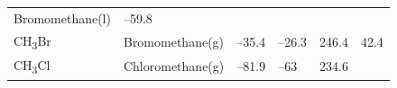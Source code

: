 \documentclass[
  9pt,
]{extbook}
\theoremstyle{definition}
\theoremstyle{definition}
\theoremstyle{definition}
\theoremstyle{remark}
\begin{document}
\begin{longtable}[]{@{}llllll@{}}
\begin{minipage}[t]{0.17\columnwidth}
Bromomethane(l)\strut
\end{minipage} & \begin{minipage}[t]{0.15\columnwidth}\raggedright
--59.8\strut
\end{minipage} & \begin{minipage}[t]{0.15\columnwidth}\raggedright
\strut
\end{minipage} & \begin{minipage}[t]{0.14\columnwidth}\raggedright
\strut
\end{minipage} & \begin{minipage}[t]{0.14\columnwidth}\raggedright
\strut
\end{minipage}\tabularnewline
\begin{minipage}[t]{0.07\columnwidth}\raggedright
CH\textsubscript{3}Br\strut
\end{minipage} & \begin{minipage}[t]{0.17\columnwidth}\raggedright
Bromomethane(g)\strut
\end{minipage} & \begin{minipage}[t]{0.15\columnwidth}\raggedright
--35.4\strut
\end{minipage} & \begin{minipage}[t]{0.15\columnwidth}\raggedright
--26.3\strut
\end{minipage} & \begin{minipage}[t]{0.14\columnwidth}\raggedright
246.4\strut
\end{minipage} & \begin{minipage}[t]{0.14\columnwidth}\raggedright
42.4\strut
\end{minipage}\tabularnewline
\begin{minipage}[t]{0.07\columnwidth}\raggedright
CH\textsubscript{3}Cl\strut
\end{minipage} & \begin{minipage}[t]{0.17\columnwidth}\raggedright
Chloromethane(g)\strut
\end{minipage} & \begin{minipage}[t]{0.15\columnwidth}\raggedright
--81.9\strut
\end{minipage} & \begin{minipage}[t]{0.15\columnwidth}\raggedright
--63\strut
\end{minipage} & \begin{minipage}[t]{0.14\columnwidth}\raggedright
234.6\strut
\end{minipage} & \begin{minipage}[t]{0.14\columnwidth}\raggedright

\end{minipage}
\end{longtable}
\end{document}
